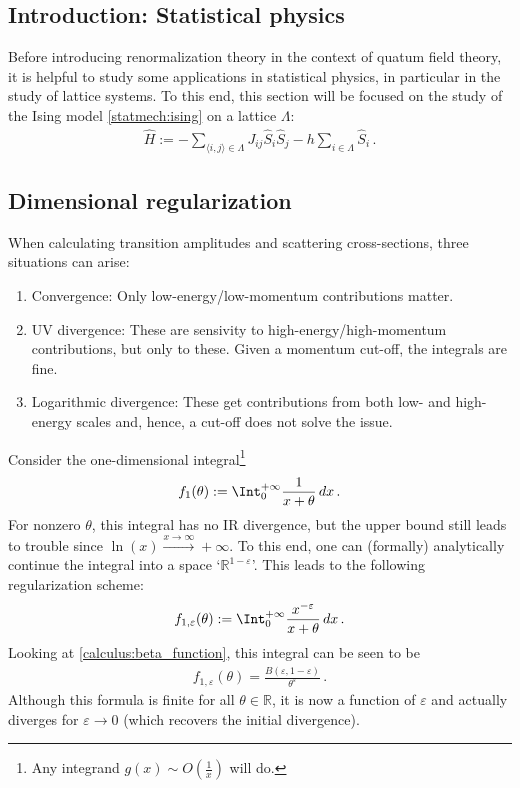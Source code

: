\subsection{Introduction: Statistical physics}

    Before introducing renormalization theory in the context of quatum field theory, it is helpful to study some applications in statistical physics, in particular in the study of lattice systems. To this end, this section will be focused on the study of the Ising model \ref{statmech:ising} on a lattice $\Lambda$:
    \begin{gather}
        \widehat{H} := -\sum_{\langle i,j \rangle\in\Lambda}J_{ij}\widehat{S}_i\widehat{S}_j-h\sum_{i\in\Lambda}\widehat{S}_i\,.
    \end{gather}

\subsection{Dimensional regularization}

    When calculating transition amplitudes and scattering cross-sections, three situations can arise:
    \begin{enumerate}
        \item Convergence: Only low-energy/low-momentum contributions matter.
        \item UV divergence: These are sensivity to high-energy/high-momentum contributions, but only to these. Given a momentum cut-off, the integrals are fine.
        \item Logarithmic divergence: These get contributions from both low- and high-energy scales and, hence, a cut-off does not solve the issue.
    \end{enumerate}

    Consider the one-dimensional integral\footnote{Any integrand $g(x)\sim O(\frac{1}{x})$ will do.}
    \begin{gather}
        f_1(\theta) := \Int_0^{+\infty}\frac{1}{x+\theta}\,dx\,.
    \end{gather}
    For nonzero $\theta$, this integral has no IR divergence, but the upper bound still leads to trouble since $\ln(x)\xrightarrow{x\longrightarrow\infty}+\infty$. To this end, one can (formally) analytically continue the integral into a space `$\mathbb{R}^{1-\varepsilon}$'. This leads to the following regularization scheme:
    \begin{gather}
        f_{1,\varepsilon}(\theta) := \Int_0^{+\infty}\frac{x^{-\varepsilon}}{x+\theta}\,dx\,.
    \end{gather}
    Looking at \cref{calculus:beta_function}, this integral can be seen to be
    \begin{gather}
        f_{1,\varepsilon}(\theta) = \frac{B(\varepsilon,1-\varepsilon)}{\theta^\varepsilon}\,.
    \end{gather}
    Although this formula is finite for all $\theta\in\mathbb{R}$, it is now a function of $\varepsilon$ and actually diverges for $\varepsilon\longrightarrow0$ (which recovers the initial divergence).

